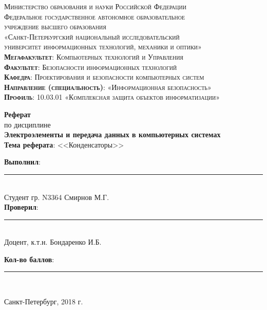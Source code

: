 \begin{titlepage}
	\begin{center}
		\textsc{
			\fontsize{12pt}{14pt}\selectfont
			Министерство образования и науки Российской Федерации\\
			Федеральное государственное автономное образовательное\\
			учреждение высшего образования\\
			«Санкт-Петербургский национальный исследовательский\\
			университет информационных технологий, механики и оптики»\\
			\textbf{Мегафакультет}:  Компьютерных технологий и Управления\\
			\textbf{Факультет}: Безопасности информационных технологий\\
			\textbf{Кафедра}: Проектирования и безопасности компьютерных систем\\
			\textbf{Направление (специальность)}: «Информационная безопасность»\\
			\textbf{Профиль}: 10.03.01 «Комплексная защита объектов информатизации»}
		
		\vfill
		
		\textbf{Реферат}\\
		по дисциплине\\
		\textbf{Электроэлементы и передача данных в компьютерных системах}\\
	\vfill
	\textbf{Тема реферата}: <<Конденсаторы>>\\
	\end{center}

	\vfill
	
	\begin{flushright}
	\textbf{Выполнил}: \rule{10em}{.1pt}\\
	Студент гр. N3364 Смирнов М.Г.\\
	\textbf{Проверил}: \rule{10em}{.1pt}\\
	Доцент, к.т.н. Бондаренко И.Б.
		\vfill

	\textbf{Кол-во баллов}: \rule{10em}{.1pt}\\

	\vfill
	


	\end{flushright}
	\vfill
	\begin{center}
		Санкт-Петербург, 2018 г.
	\end{center}
\end{titlepage}